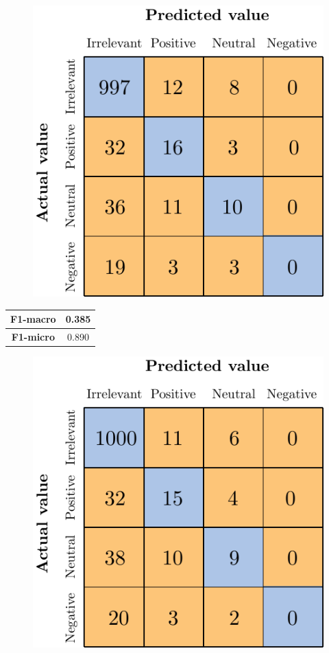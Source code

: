 \begin{figure}[H]
	\centering
	\includegraphics[scale=1]{figures/conf_matrices/ita_4l_svm/ita_4l_svm_bfs.pdf}
	\label{fig:ita_4l_svm_bfs}
\end{figure}

\begin{center}
	\begin{tabular}{ | c | c | } 
		\hline
		\textbf{F1-macro} & 0.385 \\
		\hline
		\textbf{F1-micro} & 0.890 \\ 
		\hline
	\end{tabular}
\end{center}



\begin{figure}[H]
	\centering
	\includegraphics[scale=1]{figures/conf_matrices/ita_4l_svm/ita_4l_svm_afs.pdf}
	\label{fig:ita_4l_svm_afs}
\end{figure}


